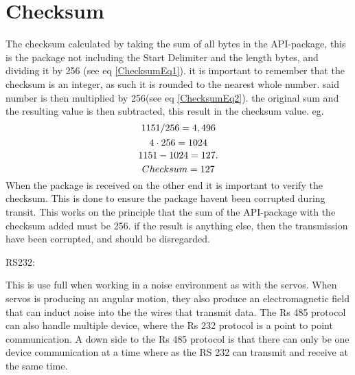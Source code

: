   \section{Checksum}
  The checksum calculated by taking the sum of all bytes in the API-package, this is the package not including the Start Delimiter and the length bytes, and dividing it by 256 (see eq \ref{ChecksumEq1}). it is important to remember that the checksum is an integer, as such it is rounded to the nearest whole number. said number is then multiplied by 256(see eq \ref{ChecksumEq2}). the original sum and the resulting value is then subtracted, this result in the checksum value.
eg.
\begin{equation}\label{ChecksumEq1}
1151/256=4,496\\
\end{equation}
\begin{equation}\label{ChecksumEq2}
4 \cdot 256=1024\\
\end{equation}
\begin{equation}\label{ChecksumEq3}
1151-1024=127.\\ 
\end{equation}
\begin{equation}\label{ChecksumEq4}
Checksum=127\\ 
\end{equation}
When the package is received on the other end it is important to verify the checksum. This is done to ensure the package havent been corrupted during transit.
This works on the principle that the sum of the API-package with the checksum added must be 256. if the result is anything else, then the transmission have been corrupted, and should be disregarded.

RS232:

This is use full when working in a noise environment as with the servos. When servos is producing an angular motion, they also produce an electromagnetic field that can induct noise into the the wires that transmit data. 
The Rs 485 protocol can also handle multiple device, where the Rs 232 protocol is a point to point communication. A down side to the Rs 485 protocol is that there can only be one device communication at a time where as the RS 232 can transmit and receive at the same time\cite{RS232}.\\